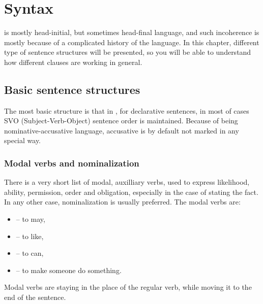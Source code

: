 \chapter{Syntax}
\label{ch:syntax}

\andro is mostly head-initial, but sometimes head-final language, and such
incoherence is mostly because of a complicated history of the language. In this
chapter, different type of sentence structures will be presented, so you will be
able to understand how different clauses are working in general.

\section{Basic sentence structures}
\label{sec:basic}

The most basic structure is that in \andro, for declarative sentences, in most
of cases SVO (Subject-Verb-Object) sentence order is maintained. Because of
being nominative-accusative language, accusative is by default not marked in
any special way.


\subsection{Modal verbs and nominalization}

There is a very short list of modal, auxilliary verbs, used to express
likelihood, ability, permission, order and obligation, especially in the case of
stating the fact. In any other case, nominalization is usually preferred. The
modal verbs are:

\begin{itemize}
    \item {} -- to may,
    \item {} -- to like,
    \item {} -- to can,
    \item {} -- to make someone do something.
\end{itemize}



Modal verbs are staying in the place of the regular verb, while moving it to the
end of the sentence.

